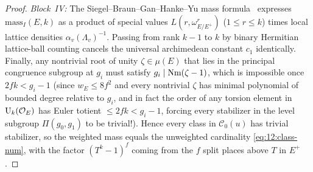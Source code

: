 \begin{proof}
\emph{Block~IV:} The Siegel--Braun--Gan--Hanke--Yu mass formula~\cite{Siegel1935,Braun1941,GanHankeYu2001} expresses $\mathrm{mass}_I(E, k)$ as a product of special values $L(r, \omega_{E/E^+}^r)$ ($1 \le r \le k$) times local lattice densities $\alpha_v(\Lambda_v)^{-1}$. Passing from rank $k-1$ to $k$ by binary Hermitian lattice-ball counting cancels the universal archimedean constant $c_1$ identically. Finally, any nontrivial root of unity $\zeta \in \mu(E)$ that lies in the principal congruence subgroup at $g_i$ must satisfy $g_i \mid \operatorname{Nm}(\zeta - 1)$, which is impossible once $2 f k < g_i - 1$ (since $w_E \le 8 f^2$ and every nontrivial $\zeta$ has minimal polynomial of bounded degree relative to $g_i$, and in fact the order of any torsion element in $\mathrm{U}_k(\mathcal{O}_E)$ has Euler totient $\le 2 f k < g_i - 1$, forcing every stabilizer in the level subgroup $\Pi(g_0, g_1)$ to be trivial!). Hence every class in $\mathcal{C}_0(u)$ has trivial stabilizer, so the weighted mass equals the unweighted cardinality \eqref{eq:12:class-num}, with the factor $(T^k - 1)^f$ coming from the $f$ split places above $T$ in $E^+$.
\end{proof}
